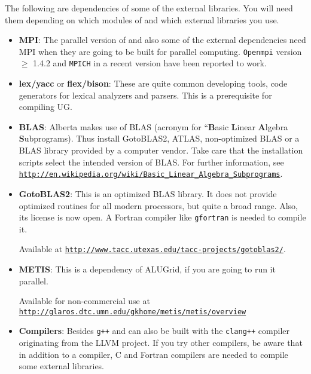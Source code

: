 The following are dependencies of some of the external libraries. You
will need them depending on which modules of \Dune and which external
libraries you use.

\begin{itemize}
\item \textbf{MPI}: The parallel version of \Dune and also some of the
  external dependencies need MPI when they are going to be built for
  parallel computing. \texttt{Openmpi} version $\geqslant$ 1.4.2 and
  \texttt{MPICH} in a recent version have been reported to work.

\item \textbf{lex/yacc} or \textbf{flex/bison}: These are quite common
  developing tools, code generators for lexical analyzers and
  parsers. This is a prerequisite for compiling UG.

\item \textbf{BLAS}: Alberta makes use of BLAS (acronym for
  ``\textbf{B}asic \textbf{L}inear \textbf{A}lgebra
  \textbf{S}ubprograms). Thus install GotoBLAS2, ATLAS,
  non-optimized BLAS or a BLAS library provided by a computer
  vendor. Take care that the installation scripts select the intended
  version of BLAS. For further information, see
  \texttt{\url{http://en.wikipedia.org/wiki/Basic_Linear_Algebra_Subprograms}}.

\item \textbf{GotoBLAS2}: This is an optimized BLAS library. It does
  not provide optimized routines for all modern processors, but quite
  a broad range. Also, its license is now open. A Fortran compiler
  like \texttt{gfortran} is needed to compile it.

  Available at
  \texttt{\url{http://www.tacc.utexas.edu/tacc-projects/gotoblas2/}}.

\item \textbf{METIS}: This is a dependency of ALUGrid, if you are
  going to run it parallel.

  Available for non-commercial use at
  \texttt{\url{http://glaros.dtc.umn.edu/gkhome/metis/metis/overview}}

\item \textbf{Compilers}: Besides \texttt{g++} \Dune and \eWoms can
  also be built with the \texttt{clang++} compiler originating from
  the LLVM project. If you try other compilers, be aware that in addition to a
  \Cplusplus compiler, C and Fortran compilers are needed to compile
  some external libraries.
\end{itemize}

